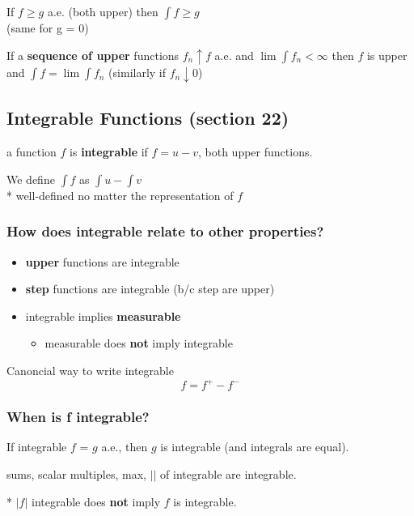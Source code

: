 \documentclass[a4paper, 12pt]{article}
\newcommand{\bt}[1]{\textbf{#1}} %
\newcommand{\gray}[1]{{\leavevmode\color[gray]{0.5}{#1}}} %
\begin{document}
\begin{multicols}{2}
If $f \geq g$ a.e. (both upper) then $\int f \geq g$\\
(same for g = 0)

If a \bt{sequence of upper} functions $f_n \uparrow f$ a.e. 
and $\lim \int f_n < \infty$ then $f$ is upper 
and $\int f = \lim \int f_n$
(similarly if $f_n \downarrow 0$)

\subsection{Integrable Functions (section 22)}


a function $f$ is \bt{integrable} if $f = u - v$, both upper functions.

We define $\int f$ as $\int u - \int v$\\
* well-defined no matter the representation of $f$

\subsubsection{How does integrable relate to other properties?}
\begin{itemize}
    \item \bt{upper} functions are integrable
    \item \bt{step} functions are integrable (b/c step are upper)
    \item integrable implies \bt{measurable}
        \begin{itemize}
            \item measurable does \bt{not} imply integrable\\
            \gray{e.g., constant functions are measurable, but only integrable
            when $\mu(X) < \infty$.}
        \end{itemize}
\end{itemize}

Canoncial way to write integrable 
$$f = f^+ - f^-$$
\gray{b/c: both $f^+$ and $f^-$ are upper if $f$ is integrable}

\subsubsection{When is f integrable?}

If integrable $f$ = $g$ a.e., then $g$ is integrable (and integrals are equal).

sums, scalar multiples, max, $| |$ of integrable are integrable.

* $|f|$ integrable does \bt{not} imply $f$ is integrable.


\end{multicols}
\end{document}
